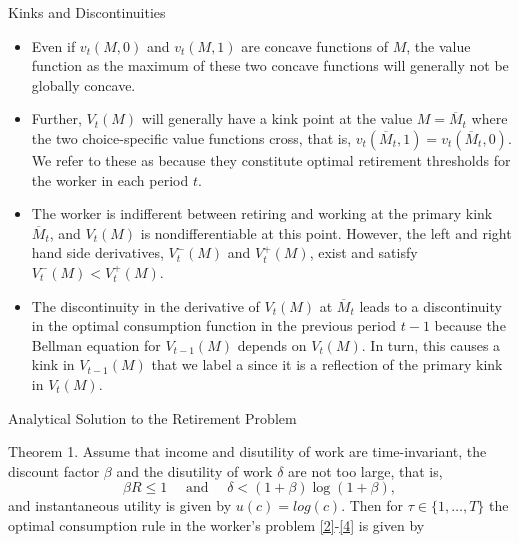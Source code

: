 \documentclass[aspectratio=169]{beamer}
\newcommand{\highlight}[1]{{\color{blue}{#1}}}
\begin{document}
\begin{frame}{Kinks and Discontinuities}
	
\begin{itemize}
	\item Even if $v_t(M, 0)$ and $v_t(M, 1)$ are concave functions of $M$, the value function as the maximum of these two concave functions will generally not be globally concave.
	\item Further, $V_t(M)$ will generally have a kink point at the value $M = \overline{M}_t$ where the two choice-specific value functions cross, that is, $v_t(\overline{M}_t, 1) = v_t(\overline{M}_t, 0)$. We refer to these as \highlight{primary kinks}  because they constitute optimal retirement thresholds for the worker in each period $t$. 
	\item The worker is indifferent between retiring and working at the primary kink $\overline{M}_t$, and $V_t(M)$ is nondifferentiable at this point. However, the left and right hand side derivatives, $V_t^{-}(M)$ and $V_t^{+}(M)$, exist and satisfy $V_t^{-}(M) < V_t^{+}(M)$.
	\item The discontinuity in the derivative of $V_t(M)$ at $\overline{M}_t$ leads to a discontinuity in the optimal consumption function in the previous period $t - 1$ because the Bellman equation for $V_{t-1}(M)$ depends on $V_t(M)$. In turn, this causes a kink in $V_{t-1}(M)$ that we label a \highlight{secondary kink} since it is a reflection of the primary kink in $V_t(M)$.
\end{itemize}
	
\end{frame}

\begin{frame}{Analytical Solution to the Retirement Problem}\footnotesize
	
	\begin{theorem} \label{thm1}
		Theorem 1. Assume that income and disutility of work are time-invariant, the discount factor $\beta$ and the disutility of work $\delta$ are not too large, that is, 
		\begin{equation}
			\label{6}
			\beta R \leq 1 \quad \text { and } \quad \delta<(1+\beta) \log (1+\beta),
		\end{equation}
		and instantaneous utility is given by $u(c) = log(c)$. Then for $\tau \in \{1, \ldots, T\}$ the optimal consumption rule in the worker's problem \ref{2}-\ref{4} is given by 
			
	\end{theorem}
\end{frame}
\end{document}
